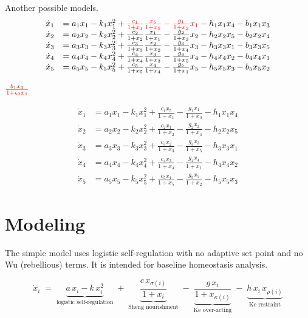\documentclass{article}
\newcommand{\RED}[1]{{\color{red}{#1}}}
\begin{document}
Another possible models. 
\begin{equation}
\begin{array}{ll}
\dot{x}_1 &=  a_1 x_1 -  k_1 x_1^2 +
\RED{\frac{c_1}{1+x_1}\frac{x_5}{1+x_5}- \frac{g_1 }{1+x_2}x_1}- h_1 x_1 x_4  - b_1 x_1x_3\\ 
\dot{x}_2 & = a_2 x_2 -  k_2 x_2^2 + \frac{c_2}{1+x_2}\frac{x_1}{1+x_1} - \frac{g_2}{1+x_3}x_2 - h_2 x_2 x_5- b_2 x_2x_4\\
\dot{x}_3 & = a_3 x_3 -  k_3 x_3^2 + \frac{c_3}{1+x_3}\frac{x_2}{1+x_2} - \frac{g_3}{1+x_4}x_3 - h_3 x_3 x_1- b_3 x_3 x_5\\
\dot{x}_4 & = a_4 x_4 -  k_4 x_4^2 + \frac{c_4}{1+x_4}\frac{x_3}{1+x_3} - \frac{g_4}{1+x_5}x_4 - h_4 x_4 x_2 - b_4 x_4x_1\\
\dot{x}_5 & = a_5 x_5 -  k_5 x_5^2 + \frac{c_5}{1+x_5}\frac{x_4}{1+x_4} - \frac{g_5}{1+x_1}x_5 - h_5 x_5 x_3- b_5 x_5x_2\\
\end{array}
\end{equation}

$\RED{\frac{b_1 x_3}{1 + \epsilon_0 x_1}}$

\begin{equation}
\begin{array}{ll}
\dot{x}_1 &= a_1 x_1 - k_1 x_1^2 + \frac{c_1 x_5}{1+x_1} - \frac{g_1 x_1}{1+x_3} - h_1 x_1 x_4 \\
\dot{x}_2 &= a_2 x_2 - k_2 x_2^2 + \frac{c_2 x_1}{1+x_2} - \frac{g_2 x_2}{1+x_4} - h_2 x_2 x_5 \\
\dot{x}_3 &= a_3 x_3 - k_3 x_3^2 + \frac{c_3 x_2}{1+x_3} - \frac{g_3 x_3}{1+x_5} - h_3 x_3 x_1 \\
\dot{x}_4 &= a_4 x_4 - k_4 x_4^2 + \frac{c_4 x_3}{1+x_4} - \frac{g_4 x_4}{1+x_1} - h_4 x_4 x_2 \\
\dot{x}_5 &= a_5 x_5 - k_5 x_5^2 + \frac{c_5 x_4}{1+x_5} - \frac{g_5 x_5}{1+x_2} - h_5 x_5 x_3
\end{array}
\end{equation}



\section{Modeling}
The simple model uses logistic self-regulation with no adaptive
set point and no Wu (rebellious) terms. It is intended for
baseline homeostasis analysis.

\begin{equation}\label{eq:simple}
\dot{x}_i \;=\;
\underbrace{a\, x_i - k\, x_i^2}_{\text{logistic self-regulation}}
\;+\;
\underbrace{\frac{c\, x_{\sigma(i)}}{1 + x_i}}_{\text{Sheng nourishment}}
\;-\;
\underbrace{\frac{g\, x_i}{1 + x_{\kappa(i)}}}_{\text{Ke over-acting}}
\;-\;
\underbrace{h\, x_i\, x_{\rho(i)}}_{\text{Ke restraint}}
\end{equation}
\end{document}
